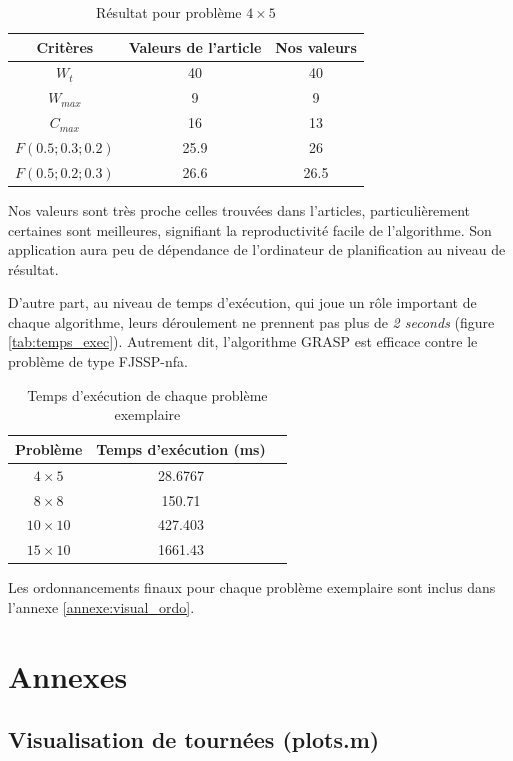 \documentclass[10pt,a4paper]{scrartcl}
\begin{document}
\begin{table}[!h]
  \centering
  \begin{tabular}{|c|c|c|}
    \hline
    Critères & Valeurs de l'article & Nos valeurs \\
    \hline
    $W_t$ & 40 & 40 \\
    $W_{max}$ & 9 & 9 \\
    $C_{max}$ & 16 & 13 \\
    $F(0.5;0.3;0.2)$ & 25.9 & 26 \\
    $F(0.5;0.2;0.3)$ & 26.6 & 26.5 \\
    \hline
  \end{tabular}
  \caption{Résultat pour problème $4 \times 5$}
\end{table}

Nos valeurs sont très proche celles trouvées dans l'articles, particulièrement certaines sont meilleures, signifiant la reproductivité facile de l'algorithme. Son application aura peu de dépendance de l'ordinateur de planification au niveau de résultat.

D'autre part, au niveau de temps d'exécution, qui joue un rôle important de chaque algorithme, leurs déroulement ne prennent pas plus de \emph{2 seconds} (figure \eqref{tab:temps_exec}). Autrement dit, l'algorithme GRASP est efficace contre le problème de type FJSSP-nfa.

\begin{table}[!h]
  \centering
  \begin{tabular}{|c|c|c|}
    \hline
    Problème & Temps d'exécution (ms) \\
    \hline
    $4 \times 5$ & 28.6767 \\
    $8 \times 8$ & 150.71 \\
    $10 \times 10$ & 427.403 \\
    $15 \times 10$ & 1661.43 \\
    \hline
  \end{tabular}
  \caption{Temps d'exécution de chaque problème exemplaire}
  \label{tab:temps_exec}
\end{table}

Les ordonnancements finaux pour chaque problème exemplaire sont inclus dans l'annexe \eqref{annexe:visual_ordo}.

\section{Annexes}

\subsection{Visualisation de tournées (plots.m)}
\end{document}
